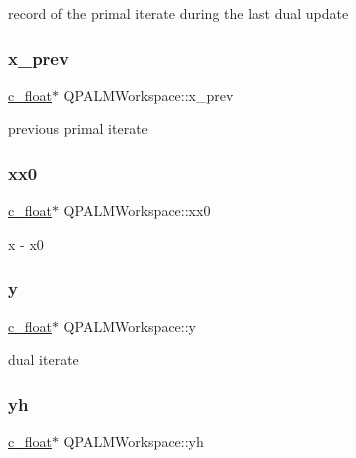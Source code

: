 record of the primal iterate during the last dual update 

\mbox{\label{structQPALMWorkspace_a6bd9099b5f7a4008be9eddf61bc1bd13}} 
\subsubsection{\texorpdfstring{x\_prev}{x\_prev}}
{\footnotesize\ttfamily \mbox{\hyperlink{global__opts_8h_a7f1a9fda95e52979658c20a0d134fb15}{c\+\_\+float}}$\ast$ Q\+P\+A\+L\+M\+Workspace\+::x\+\_\+prev}



previous primal iterate 

\mbox{\label{structQPALMWorkspace_addac4a91d2b85cb9e388cd2dc65cb455}} 
\subsubsection{\texorpdfstring{xx0}{xx0}}
{\footnotesize\ttfamily \mbox{\hyperlink{global__opts_8h_a7f1a9fda95e52979658c20a0d134fb15}{c\+\_\+float}}$\ast$ Q\+P\+A\+L\+M\+Workspace\+::xx0}



x -\/ x0 

\mbox{\label{structQPALMWorkspace_a0d81840f72cdb13574669fc62eb44ac9}} 
\subsubsection{\texorpdfstring{y}{y}}
{\footnotesize\ttfamily \mbox{\hyperlink{global__opts_8h_a7f1a9fda95e52979658c20a0d134fb15}{c\+\_\+float}}$\ast$ Q\+P\+A\+L\+M\+Workspace\+::y}



dual iterate 

\mbox{\label{structQPALMWorkspace_a12cd413a80f3e029802beb280e76d348}} 
\subsubsection{\texorpdfstring{yh}{yh}}
{\footnotesize\ttfamily \mbox{\hyperlink{global__opts_8h_a7f1a9fda95e52979658c20a0d134fb15}{c\+\_\+float}}$\ast$ Q\+P\+A\+L\+M\+Workspace\+::yh}



